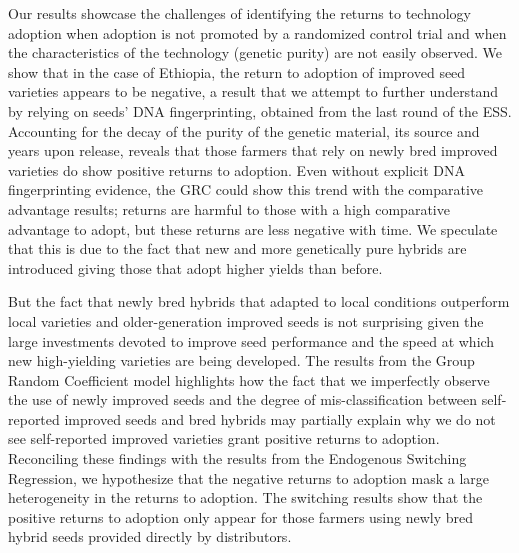 \documentclass[11pt]{article}
\begin{document}

Our results showcase the challenges of identifying the returns to technology adoption when adoption is not promoted by a randomized control trial and when the characteristics of the technology (genetic purity) are not easily observed. We show that in the case of Ethiopia, the return to adoption of improved seed varieties appears to be negative, a result that we attempt to further understand by relying on seeds' DNA fingerprinting, obtained from the last round of the ESS. Accounting for the decay of the purity of the genetic material, its source and years upon release, reveals that those farmers that rely on newly bred improved varieties do show positive returns to adoption. Even without explicit DNA fingerprinting evidence, the GRC could show this trend with the comparative advantage results; returns are harmful to those with a high comparative advantage to adopt, but these returns are less negative with time. We speculate that this is due to the fact that new and more genetically pure hybrids are introduced giving those that adopt higher yields than before.

But the fact that newly bred hybrids that adapted to local conditions outperform local varieties and older-generation improved seeds is not surprising given the large investments devoted to improve seed performance and the speed at which new high-yielding varieties are being developed. The results from the Group Random Coefficient model highlights how the fact that we imperfectly observe the use of newly improved seeds and the degree of mis-classification between self-reported improved seeds and bred hybrids may partially explain why we do not see self-reported improved varieties grant positive returns to adoption. Reconciling these findings with the results from the Endogenous Switching Regression, we hypothesize that the negative returns to adoption mask a large heterogeneity in the returns to adoption. The switching results show that the positive returns to adoption only appear for those farmers using newly bred hybrid seeds provided directly by distributors. 
\end{document}
